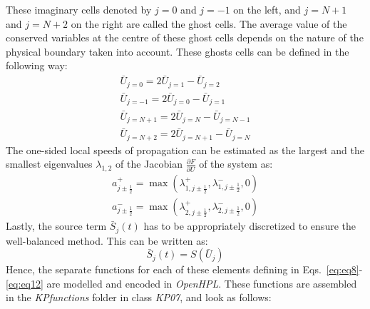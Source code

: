 \documentclass[%
]{USN-PhD}
\begin{document}
These imaginary cells denoted by $j=0$ and $j=-1$ on the left, and $j=N+1$ and $j=N+2$ on the right are called the ghost cells. The average value of the conserved variables at the centre of these ghost cells depends on the nature of the physical boundary taken into account. These ghosts cells can be defined in the following way:
\begin{equation}\label{eq:eq11}
\begin{array}{c}
\bar{U}_{j=0}=2\bar{U}_{j=1}-\bar{U}_{j=2}\\
\bar{U}_{j=-1}=2\bar{U}_{j=0}-\bar{U}_{j=1}\\
\bar{U}_{j=N+1}=2\bar{U}_{j=N}-\bar{U}_{j=N-1}\\
\bar{U}_{j=N+2}=2\bar{U}_{j=N+1}-\bar{U}_{j=N}
\end{array}
\end{equation}
The one-sided local speeds of propagation can be estimated as the largest and the smallest eigenvalues $\lambda_{1,2}$ of the Jacobian $\frac{\partial F}{\partial U}$ of the system as:
\begin{equation}\label{eq:eq12}
\begin{array}{c}
a^+_{j\pm\frac{1}{2}}=\max\left(\lambda^+_{1,j\pm\frac{1}{2}},\lambda^-_{1,j\pm\frac{1}{2}},0\right)\\
a^-_{j\pm\frac{1}{2}}=\max\left(\lambda^+_{2,j\pm\frac{1}{2}},\lambda^-_{2,j\pm\frac{1}{2}},0\right)
\end{array}
\end{equation}
Lastly, the source term $\bar{S}_j\left(t\right)$ has to be appropriately discretized to ensure the well-balanced method. This can be written as:
\begin{equation}
\bar{S}_j\left(t\right)=S\left(\bar{U}_j\right)
\end{equation}
Hence, the separate functions for each of these elements defining in Eqs.~\ref{eq:eq8}-\ref{eq:eq12} are modelled and encoded in \emph{OpenHPL}. These functions are assembled in the \emph{KPfunctions} folder in class \emph{KP07}, and look as follows:
\end{document}
